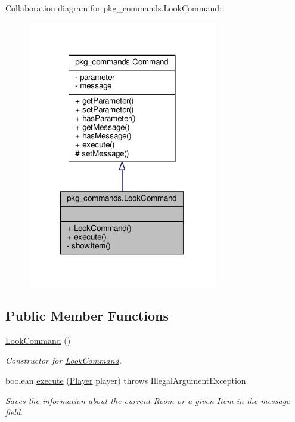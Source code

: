 Collaboration diagram for pkg\-\_\-commands.\-Look\-Command\-:\nopagebreak
\begin{figure}[H]
\begin{center}
\leavevmode
\includegraphics[width=234pt]{classpkg__commands_1_1LookCommand__coll__graph}
\end{center}
\end{figure}
\subsection*{Public Member Functions}
\begin{DoxyCompactItemize}
\item 
\hyperlink{classpkg__commands_1_1LookCommand_ab689f51a18ea2d40ab995099e076112c}{Look\-Command} ()
\begin{DoxyCompactList}\small\item\em Constructor for \hyperlink{classpkg__commands_1_1LookCommand}{Look\-Command}. \end{DoxyCompactList}\item 
boolean \hyperlink{classpkg__commands_1_1LookCommand_af336146fae1e14bf434d85a5acbcdcd7}{execute} (\hyperlink{classpkg__world_1_1Player}{Player} player)  throws Illegal\-Argument\-Exception 
\begin{DoxyCompactList}\small\item\em Saves the information about the current Room or a given Item in the message field. \end{DoxyCompactList}\end{DoxyCompactItemize}
